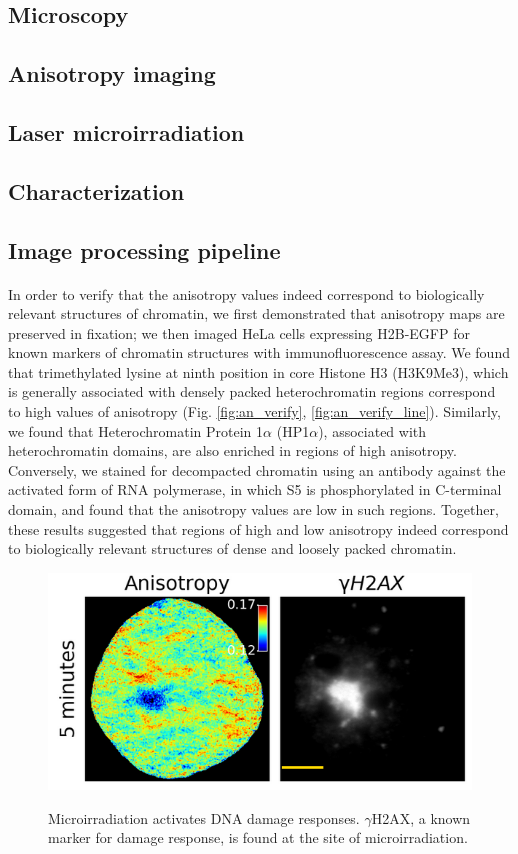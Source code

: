 \subsection{Microscopy}
\subsection{Anisotropy imaging}
\subsection{Laser microirradiation}

\subsection{Characterization}
\subsection{Image processing pipeline}

\paragraph*{} In order to verify that the anisotropy values indeed correspond to biologically relevant structures of chromatin, we first demonstrated that anisotropy maps are preserved in fixation; we then imaged HeLa cells expressing H2B-EGFP for known markers of chromatin structures with immunofluorescence assay. We found that trimethylated lysine at ninth position in core Histone H3 (H3K9Me3), which is generally associated with densely packed heterochromatin regions correspond to high values of anisotropy (Fig. \ref{fig:an_verify}, \ref{fig:an_verify_line}). Similarly, we found that Heterochromatin Protein 1$\alpha$ (HP1$\alpha$), associated with heterochromatin domains, are also enriched in regions of high anisotropy. Conversely, we stained for decompacted chromatin using an antibody against the activated form of RNA polymerase, in which S5 is phosphorylated in C-terminal domain, and found that the anisotropy values are low in such regions. Together, these results suggested that regions of high and low anisotropy indeed correspond to biologically relevant structures of dense and loosely packed chromatin.  

\begin{figure}[H]
    {\hfill\includegraphics[clip,width=0.8\linewidth]{figures/micro_gh2ax.png}\hspace*{\fill}}
    \caption{Microirradiation activates DNA damage responses. $\gamma$H2AX, a known marker for damage response, is found at the site of microirradiation.}
    {\label{fig:micro_gh2ax}}
\end{figure}
